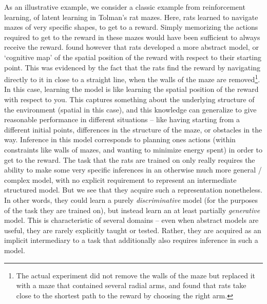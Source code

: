 As an illustrative example, we consider a classic example from reinforcement learning, of latent learning in Tolman's rat mazes\citep{tolman1948cognitive}. Here, rats learned to navigate mazes of very specific shapes, to get to a reward. Simply memorizing the actions required to get to the reward in these mazes would have been sufficient to always receive the reward. \citet{tolman1948cognitive} found however that rats developed a more abstract model, or `cognitive map' of the spatial position of the reward with respect to their starting point. This was evidenced by the fact that the rats find the reward by navigating directly to it in close to a straight line, when the walls of the maze are removed\footnote{The actual experiment did not remove the walls of the maze but replaced it with a maze that contained several radial arms, and found that rats take close to the shortest path to the reward by choosing the right arm.}. In this case, learning the model is like learning the spatial position of the reward with respect to you. This captures something about the underlying structure of the environment (spatial in this case), and this knowledge can generalize to give reasonable performance in different situations -- like having starting from a different initial points, differences in the structure of the maze, or obstacles in the way. Inference in this model corresponds to planning ones actions (within constraints like walls of mazes, and wanting to minimize energy spent) in order to get to the reward. The task that the rats are trained on only really requires the ability to make some very specific inferences in an otherwise much more general / complex model, with no explicit requirement to represent an intermediate structured model. But we see that they acquire such a representation nonetheless. In other words, they could learn a purely \textit{discriminative} model (for the purposes of the task they are trained on), but instead learn an at least partially \textit{generative} model. This is characteristic of several domains -- even when abstract models are useful, they are rarely explicitly taught or tested. Rather, they are acquired as an implicit intermediary to a task that additionally also requires inference in such a model.



